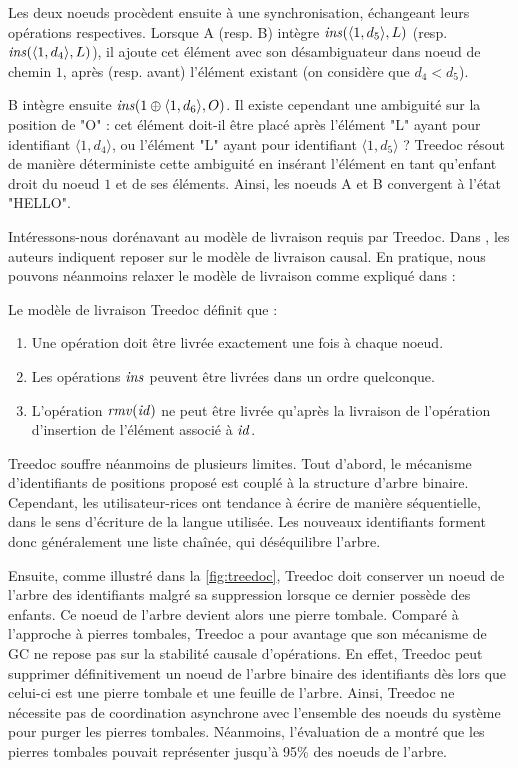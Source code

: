 Les deux noeuds procèdent ensuite à une synchronisation, échangeant leurs opérations respectives.
Lorsque A (resp. B) intègre $\mathit{ins}(\langle 1,d_5 \rangle, L)$ (resp. $\mathit{ins}(\langle 1,d_4 \rangle, L)$), il ajoute cet élément avec son désambiguateur dans noeud de chemin $1$, après (resp. avant) l'élément existant (on considère que $d_4 < d_5$).

B intègre ensuite $\mathit{ins}(1 \oplus \langle 1,d_6 \rangle, O)$.
Il existe cependant une ambiguité sur la position de "O" : cet élément doit-il être placé après l'élément "L" ayant pour identifiant $\langle 1,d_4 \rangle$, ou l'élément "L" ayant pour identifiant $\langle 1,d_5 \rangle$ ?
Treedoc résout de manière déterministe cette ambiguité en insérant l'élément en tant qu'enfant droit du noeud $1$ et de ses éléments.
Ainsi, les noeuds A et B convergent à l'état "HELLO".

Intéressons-nous dorénavant au modèle de livraison requis par Treedoc.
Dans \cite{2009-treedoc-preguica}, les auteurs indiquent reposer sur le modèle de livraison causal.
En pratique, nous pouvons néanmoins relaxer le modèle de livraison comme expliqué dans \cite{2021-these-vic} :
\begin{definition}
  Le modèle de livraison Treedoc définit que :
  \begin{enumerate}
    \item Une opération doit être livrée exactement une fois à chaque noeud.
    \item Les opérations $\mathit{ins}$ peuvent être livrées dans un ordre quelconque.
    \item L'opération $\mathit{rmv}(\mathit{id})$ ne peut être livrée qu'après la livraison de l'opération d'insertion de l'élément associé à $\mathit{id}$.
  \end{enumerate}
\end{definition}

Treedoc souffre néanmoins de plusieurs limites.
Tout d'abord, le mécanisme d'identifiants de positions proposé est couplé à la structure d'arbre binaire.
Cependant, les utilisateur-rices ont tendance à écrire de manière séquentielle, \ie dans le sens d'écriture de la langue utilisée.
Les nouveaux identifiants forment donc généralement une liste chaînée, qui déséquilibre l'arbre.

Ensuite, comme illustré dans la \autoref{fig:treedoc}, Treedoc doit conserver un noeud de l'arbre des identifiants malgré sa suppression lorsque ce dernier possède des enfants.
Ce noeud de l'arbre devient alors une pierre tombale.
Comparé à l'approche à pierres tombales, Treedoc a pour avantage que son mécanisme de \ac{GC} ne repose pas sur la stabilité causale d'opérations.
En effet, Treedoc peut supprimer définitivement un noeud de l'arbre binaire des identifiants dès lors que celui-ci est une pierre tombale et une feuille de l'arbre.
Ainsi, Treedoc ne nécessite pas de coordination asynchrone avec l'ensemble des noeuds du système pour purger les pierres tombales.
Néanmoins, l'évaluation de \cite{2009-treedoc-preguica} a montré que les pierres tombales pouvait représenter jusqu'à 95\% des noeuds de l'arbre.

